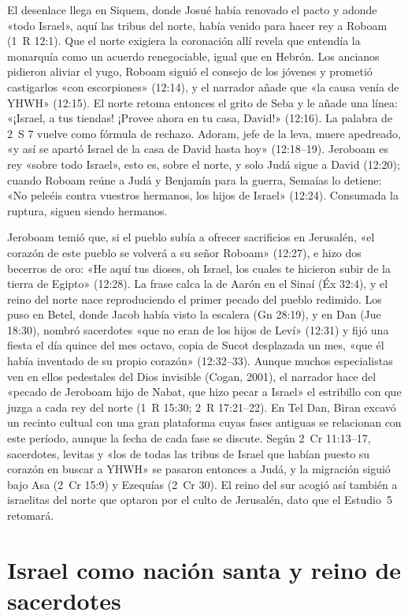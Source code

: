 \documentclass[11pt,letterpaper]{article}
\begin{document}
El desenlace llega en Siquem, donde Josué había renovado el pacto y adonde «todo Israel», aquí las tribus del norte, había venido para hacer rey a Roboam (1~R 12:1). Que el norte exigiera la coronación allí revela que entendía la monarquía como un acuerdo renegociable, igual que en Hebrón. Los ancianos pidieron aliviar el yugo, Roboam siguió el consejo de los jóvenes y prometió castigarlos «con escorpiones» (12:14), y el narrador añade que «la causa venía de YHWH» (12:15). El norte retoma entonces el grito de Seba y le añade una línea: «¡Israel, a tus tiendas! ¡Provee ahora en tu casa, David!» (12:16). La palabra de 2~S 7 vuelve como fórmula de rechazo. Adoram, jefe de la leva, muere apedreado, «y así se apartó Israel de la casa de David hasta hoy» (12:18--19). Jeroboam es rey «sobre todo Israel», esto es, sobre el norte, y solo Judá sigue a David (12:20); cuando Roboam reúne a Judá y Benjamín para la guerra, Semaías lo detiene: «No peleéis contra vuestros hermanos, los hijos de Israel» (12:24). Consumada la ruptura, siguen siendo hermanos.

Jeroboam temió que, si el pueblo subía a ofrecer sacrificios en Jerusalén, «el corazón de este pueblo se volverá a su señor Roboam» (12:27), e hizo dos becerros de oro: «He aquí tus dioses, oh Israel, los cuales te hicieron subir de la tierra de Egipto» (12:28). La frase calca la de Aarón en el Sinaí (Éx 32:4), y el reino del norte nace reproduciendo el primer pecado del pueblo redimido. Los puso en Betel, donde Jacob había visto la escalera (Gn 28:19), y en Dan (Jue 18:30), nombró sacerdotes «que no eran de los hijos de Leví» (12:31) y fijó una fiesta el día quince del mes octavo, copia de Sucot desplazada un mes, «que él había inventado de su propio corazón» (12:32--33). Aunque muchos especialistas ven en ellos pedestales del Dios invisible (Cogan, 2001), el narrador hace del «pecado de Jeroboam hijo de Nabat, que hizo pecar a Israel» el estribillo con que juzga a cada rey del norte (1~R 15:30; 2~R 17:21--22). En Tel Dan, Biran excavó un recinto cultual con una gran plataforma cuyas fases antiguas se relacionan con este período, aunque la fecha de cada fase se discute. Según 2~Cr 11:13--17, sacerdotes, levitas y «los de todas las tribus de Israel que habían puesto su corazón en buscar a YHWH» se pasaron entonces a Judá, y la migración siguió bajo Asa (2~Cr 15:9) y Ezequías (2~Cr 30). El reino del sur acogió así también a israelitas del norte que optaron por el culto de Jerusalén, dato que el Estudio~5 retomará.

\section{Israel como nación santa y reino de sacerdotes}
\end{document}
